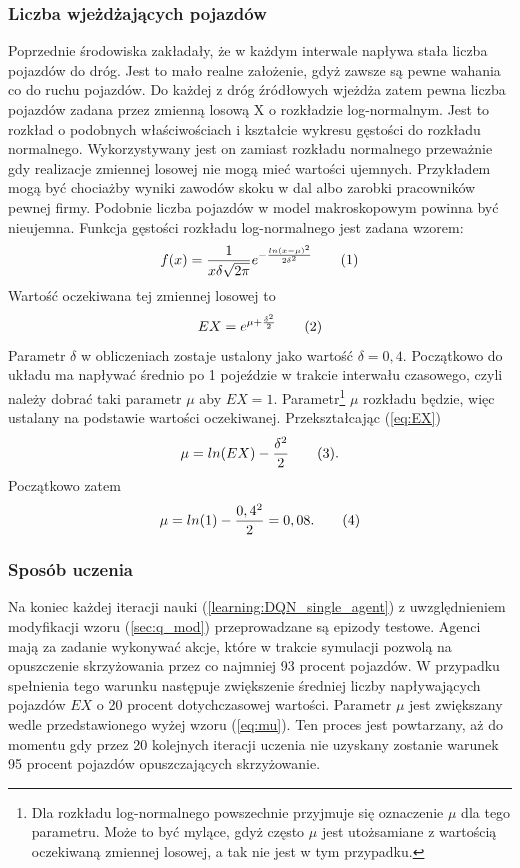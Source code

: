 \documentclass[12pt]{book}
\theoremstyle{plain}
\newcommand\addtag{\refstepcounter{equation}
\renewcommand{\labelenumii}{\theenumii}
\renewcommand{\theenumii}{\theenumi.\arabic{enumii}.}
\tag{\theequation}}
\newcommand{\myref}[1]{(\ref{#1})}
\begin{document}
\subsubsection{Liczba wjeżdżających pojazdów}
Poprzednie środowiska zakładały, że w każdym interwale napływa stała liczba pojazdów do dróg. Jest to mało realne założenie, gdyż zawsze są pewne wahania co do ruchu pojazdów. Do każdej z dróg źródłowych wjeżdża zatem pewna liczba pojazdów zadana przez zmienną losową X o rozkładzie log-normalnym. Jest to rozkład o podobnych właściwościach i kształcie wykresu gęstości do rozkładu normalnego. Wykorzystywany jest on zamiast rozkładu normalnego przeważnie gdy realizacje zmiennej losowej nie mogą mieć wartości ujemnych. Przykładem mogą być chociażby wyniki zawodów skoku w dal albo zarobki pracowników pewnej firmy. Podobnie liczba pojazdów w model makroskopowym powinna być nieujemna. Funkcja gęstości rozkładu log-normalnego jest zadana wzorem:
\[ f(x)=\frac{1}{x\delta\sqrt{2\pi}}e^{-\frac{ln(x-\mu)^2}{2\delta^2}} \addtag \]
Wartość oczekiwana tej zmiennej losowej to \[EX=e^{\mu+\frac{\delta^2}{2}} \addtag \label{eq:EX}\] Parametr $\delta$ w obliczeniach zostaje ustalony jako wartość $\delta=0,4$. Początkowo do układu ma napływać średnio po 1 pojeździe w trakcie interwału czasowego, czyli należy dobrać taki parametr $\mu$ aby $EX=1$. Parametr\footnote{Dla rozkładu log-normalnego powszechnie przyjmuje się oznaczenie $\mu$ dla tego parametru. Może to być mylące, gdyż często $\mu$ jest utożsamiane z wartością oczekiwaną zmiennej losowej, a tak nie jest w tym przypadku. }  $\mu$ rozkładu będzie, więc ustalany na podstawie wartości oczekiwanej. Przekształcając \myref{eq:EX} \[\mu=ln(EX)-\frac{\delta^2}{2} \addtag \label{eq:mu}.\] Początkowo zatem \[\mu=ln(1)-\frac{0,4^2}{2}=0,08. \addtag \] 

\subsubsection*{Sposób uczenia}
Na koniec każdej iteracji nauki \myref{learning:DQN_single_agent} z uwzględnieniem modyfikacji wzoru \myref{sec:q_mod} przeprowadzane są epizody testowe. Agenci mają za zadanie wykonywać akcje, które w trakcie symulacji pozwolą na opuszczenie skrzyżowania przez co najmniej 93 procent pojazdów. W przypadku spełnienia tego warunku następuje zwiększenie średniej liczby napływających pojazdów $EX$ o 20 procent dotychczasowej wartości. Parametr $\mu$ jest zwiększany wedle przedstawionego wyżej wzoru \myref{eq:mu}. Ten proces jest powtarzany, aż do momentu gdy przez 20 kolejnych iteracji uczenia nie uzyskany zostanie warunek 95 procent pojazdów opuszczających skrzyżowanie.
\end{document}
